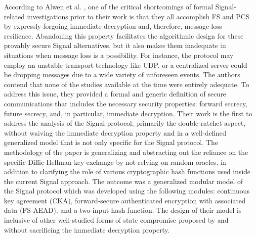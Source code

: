 \par
According to Alwen et al. \cite{alwen_coretti_dodis_2020}, one of the critical shortcomings of formal Signal-related investigations prior to their work \cite{poettering2018asynchronous,x1,x2,x3} is that they all accomplish FS and PCS by expressly forgoing immediate decryption and, therefore, message-loss resilience. Abandoning this property facilitates the algorithmic design for these provably secure Signal alternatives, but it also makes them inadequate in situations when message loss is a possibility. For instance, the protocol may employ an unstable transport technology like UDP, or a centralized server could be dropping messages due to a wide variety of unforeseen events. The authors contend that none of the studies available at the time were entirely adequate. To address this issue, they provided a formal and generic definition of secure communications that includes the necessary security properties: forward secrecy, future secrecy, and, in particular, immediate decryption. Their work is the first to address the analysis of the Signal protocol, primarily the double-ratchet aspect, without waiving the immediate decryption property and in a well-defined generalized model that is not only specific for the Signal protocol. The methodology of the paper is generalizing and abstracting out the reliance on the specific Diffie-Hellman key exchange by not relying on random oracles, in addition to clarifying the role of various cryptographic hash functions used inside the current Signal approach. The outcome was a generalized modular model of the Signal protocol which was developed using the following modules: continuous key agreement (CKA), forward-secure authenticated encryption with associated data (FS-AEAD), and a two-input hash function. The design of their model is inclusive of other well-studied forms of state compromise proposed by \cite{poettering2018asynchronous} and \cite{x2} without sacrificing the immediate decryption property.